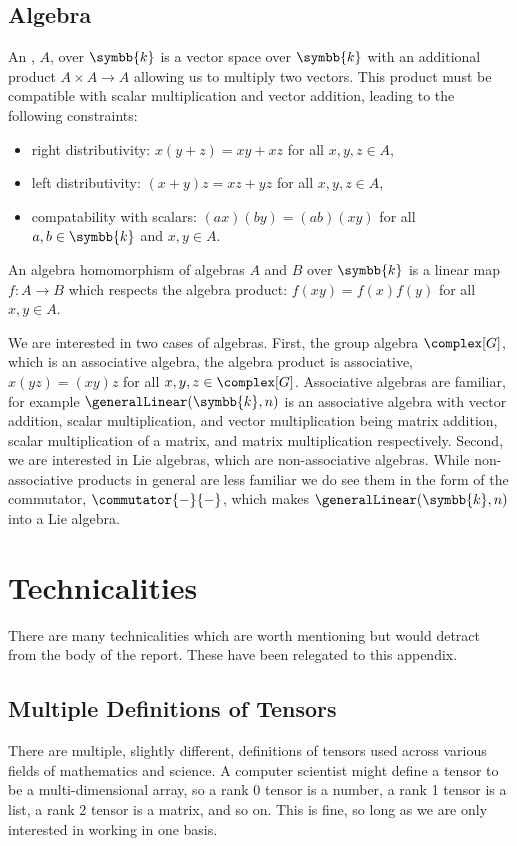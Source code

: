 \documentclass[fleqn]{NotesClass}
\renewcommand{\field}{\symbb{k}}
\begin{document}
\begin{appendices}
        \section{Algebra}\label{sec:algebras}
        An , \(A\), over \(\field\) is a vector space over \(\field\) with an additional product \(A \times A \to A\) allowing us to multiply two vectors.
        This product must be compatible with scalar multiplication and vector addition, leading to the following constraints:
        \begin{itemize}
            \item right distributivity: \(x(y + z) = xy + xz\) for all \(x, y, z \in A\),
            \item left distributivity: \((x + y)z = xz + yz\) for all \(x, y, z \in A\),
            \item compatability with scalars: \((ax)(by) = (ab)(xy)\) for all \(a, b \in \field\) and \(x, y \in A\).
        \end{itemize}
        
        An algebra homomorphism of algebras \(A\) and \(B\) over \(\field\) is a linear map \(f \colon A \to B\) which respects the algebra product: \(f(xy) = f(x)f(y)\) for all \(x, y \in A\).
        
        We are interested in two cases of algebras.
        First, the group algebra \(\complex[G]\), which is an associative algebra, the algebra product is associative, \(x(yz) = (xy)z\) for all \(x, y, z \in \complex[G]\).
        Associative algebras are familiar, for example \(\generalLinear(\field, n)\) is an associative algebra with vector addition, scalar multiplication, and vector multiplication being matrix addition, scalar multiplication of a matrix, and matrix multiplication respectively.
        Second, we are interested in Lie algebras, which are non-associative algebras.
        While non-associative products in general are less familiar we do see them in the form of the commutator, \(\commutator{-}{-}\), which makes \(\generalLinear(\field, n)\) into a Lie algebra.
        
        \chapter{Technicalities}
        There are many technicalities which are worth mentioning but would detract from the body of the report.
        These have been relegated to this appendix.
        
        \section{Multiple Definitions of Tensors}\label{sec:technicalities tensor defs}
        There are multiple, slightly different, definitions of tensors used across various fields of mathematics and science.
        A computer scientist might define a tensor to be a multi-dimensional array, so a rank 0 tensor is a number, a rank 1 tensor is a list, a rank 2 tensor is a matrix, and so on.
        This is fine, so long as we are only interested in working in one basis.
        

\end{appendices}
\end{document}
